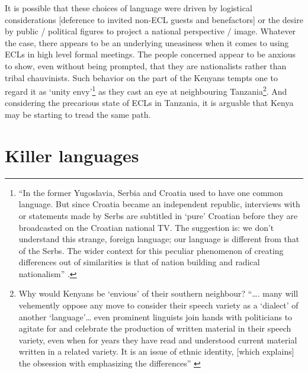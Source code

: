 \documentclass[output=paper,colorlinks,citecolor=brown]{langscibook}
\begin{document}
It is possible that these choices of language were driven by logistical considerations [deference to invited non-ECL guests and benefactors] or the desire by public / political figures to project a national perspective / image. Whatever the case, there appears to be an underlying uneasiness when it comes to using ECLs in high level formal meetings. The people concerned appear to be anxious to show, even without being prompted, that they are nationalists rather than tribal chauvinists. Such behavior on the part of the Kenyans tempts one to regard it as ‘unity envy’\footnote{“In the former Yugoslavia, Serbia and Croatia used to have one common language. But since Croatia became an independent republic, interviews with or statements made by Serbs are subtitled in ‘pure’ Croatian before they are broadcasted on the Croatian national TV. The suggestion is: we don’t understand this strange, foreign language; our language is different from that of the Serbs. The wider context for this peculiar phenomenon of creating differences out of similarities is that of nation building and radical nationalism” \citep[1]{Blommaert2014}.} as they cast an eye at neighbouring Tanzania\footnote{Why would Kenyans be ‘envious’ of their southern neighbour?  “…. many will vehemently oppose any move to consider their speech variety as a ‘dialect’ of another ‘language’… even prominent linguists join hands with politicians to agitate for and celebrate the production of written material in their speech variety, even when for years they have read and understood current material written in a related variety. It is an issue of ethnic identity, [which explains] the obsession with emphasizing the differences”  \citep[244]{Kioko2017}
}.  And considering the precarious state of ECLs in Tanzania, it is arguable that Kenya may be starting to tread the same path.

\section{Killer languages}\label{sec:kioko:5}
\end{document}
